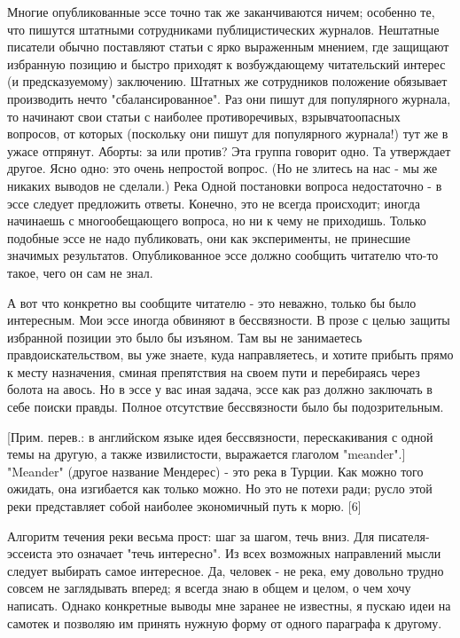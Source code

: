 \documentclass[ebook,12pt,oneside,openany]{memoir}
\begin{document}
Многие опубликованные эссе точно так же заканчиваются ничем; особенно
те, что пишутся штатными сотрудниками публицистических журналов.
Нештатные писатели обычно поставляют статьи с ярко выраженным мнением,
где защищают избранную позицию и быстро приходят к возбуждающему
читательский интерес (и предсказуемому) заключению. Штатных же
сотрудников положение обязывает производить нечто "сбалансированное".
Раз они пишут для популярного журнала, то начинают свои статьи с
наиболее противоречивых, взрывчатоопасных вопросов, от которых
(поскольку они пишут для популярного журнала!) тут же в ужасе
отпрянут. Аборты: за или против? Эта группа говорит одно. Та
утверждает другое. Ясно одно: это очень непростой вопрос. (Но не
злитесь на нас - мы же никаких выводов не сделали.) Река Одной
постановки вопроса недостаточно - в эссе следует предложить ответы.
Конечно, это не всегда происходит; иногда начинаешь с многообещающего
вопроса, но ни к чему не приходишь. Только подобные эссе не надо
публиковать, они как эксперименты, не принесшие значимых результатов.
Опубликованное эссе должно сообщить читателю что-то такое, чего он сам
не знал.

А вот что конкретно вы сообщите читателю - это неважно, только бы было
интересным. Мои эссе иногда обвиняют в бессвязности. В прозе с целью
защиты избранной позиции это было бы изъяном. Там вы не занимаетесь
правдоискательством, вы уже знаете, куда направляетесь, и хотите
прибыть прямо к месту назначения, сминая препятствия на своем пути и
перебираясь через болота на авось. Но в эссе у вас иная задача, эссе
как раз должно заключать в себе поиски правды. Полное отсутствие
бессвязности было бы подозрительным.

[Прим. перев.: в английском языке идея бессвязности, перескакивания с
одной темы на другую, а также извилистости, выражается глаголом
"meander".] "Meander" (другое название Мендерес) - это река в Турции.
Как можно того ожидать, она изгибается как только можно. Но это не
потехи ради; русло этой реки представляет собой наиболее экономичный
путь к морю. [6]

Алгоритм течения реки весьма прост: шаг за шагом, течь вниз. Для
писателя-эссеиста это означает "течь интересно". Из всех возможных
направлений мысли следует выбирать самое интересное. Да, человек - не
река, ему довольно трудно совсем не заглядывать вперед; я всегда знаю
в общем и целом, о чем хочу написать. Однако конкретные выводы мне
заранее не известны, я пускаю идеи на самотек и позволяю им принять
нужную форму от одного параграфа к другому.
\end{document}
